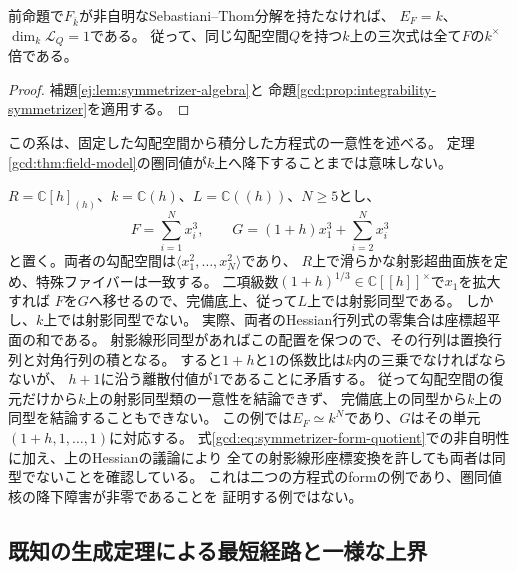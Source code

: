 \begin{corollary}[幾何学的に直和分解不能な場合]
\label{gcd:cor:indecomposable-equation}
前命題で$F_{\overline k}$が非自明なSebastiani--Thom分解を持たなければ、
$E_F=k$、$\dim_k\mathcal L_Q=1$である。
従って、同じ勾配空間$Q$を持つ$k$上の三次式は全て$F$の$k^\times$倍である。
\end{corollary}
\begin{proof}
補題\ref{ej:lem:symmetrizer-algebra}と
命題\ref{gcd:prop:integrability-symmetrizer}を適用する。
\end{proof}

この系は、固定した勾配空間から積分した方程式の一意性を述べる。
定理\ref{gcd:thm:field-model}の圏同値が$k$上へ降下することまでは意味しない。

\begin{example}[同じ勾配空間を持つ異なる基礎体上のform]
\label{gcd:ex:forms}
$R=\mathbb C[h]_{(h)}$、$k=\mathbb C(h)$、$L=\mathbb C((h))$、$N\ge5$とし、
\begin{equation}\label{gcd:eq:forms}
 F=\sum_{i=1}^Nx_i^3,\qquad
 G=(1+h)x_1^3+\sum_{i=2}^Nx_i^3
\end{equation}
と置く。両者の勾配空間は$\langle x_1^2,\ldots,x_N^2\rangle$であり、
$R$上で滑らかな射影超曲面族を定め、特殊ファイバーは一致する。
二項級数$(1+h)^{1/3}\in\mathbb C[[h]]^\times$で$x_1$を拡大すれば
$F$を$G$へ移せるので、完備底上、従って$L$上では射影同型である。
しかし、$k$上では射影同型でない。
実際、両者のHessian行列式の零集合は座標超平面の和である。
射影線形同型があればこの配置を保つので、その行列は置換行列と対角行列の積となる。
すると$1+h$と$1$の係数比は$k$内の三乗でなければならないが、
$h+1$に沿う離散付値が$1$であることに矛盾する。
従って勾配空間の復元だけから$k$上の射影同型類の一意性を結論できず、
完備底上の同型から$k$上の同型を結論することもできない。
この例では$E_F\simeq k^N$であり、$G$はその単元$(1+h,1,\ldots,1)$に対応する。
式\eqref{gcd:eq:symmetrizer-form-quotient}での非自明性に加え、上のHessianの議論により
全ての射影線形座標変換を許しても両者は同型でないことを確認している。
これは二つの方程式のformの例であり、圏同値核の降下障害が非零であることを
証明する例ではない。
\end{example}

\subsection{既知の生成定理による最短経路と一様な上界}

